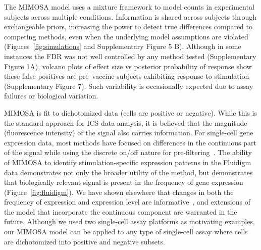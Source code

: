 \documentclass[12pt,oupdraft]{biostatistics}
\begin{document}
The MIMOSA model uses a mixture framework to model counts in experimental subjects across multiple conditions. Information is shared across subjects through exchangeable priors, increasing the power to detect true differences compared to competing methods, even when the underlying model assumptions are violated (Figures~\ref{fig:simulations} and Supplementary Figure 5 B). Although in some instances the FDR was not well controlled by any method tested (Supplementary Figure 1A), volcano plots of effect size vs posterior probability of response show these false positives are pre--vaccine subjects exhibiting response  to stimulation (Supplementary Figure 7). Such variability is occasionally expected due to assay failures or biological variation. 

MIMOSA is fit to dichotomized data (cells are positive or negative). While this is the standard approach for ICS data analysis, it is believed that the magnitude (fluorescence intensity) of the signal also carries information. For single-cell gene expression data, most methods have focused on differences in the continuous part of the signal while using the discrete on/off nature for pre-filtering~\citep{Flatz:2011jb}. 
The ability of MIMOSA to identify stimulation-specific expression patterns in the Fluidigm data demonstrates not only the broader utility of the method, but demonstrates that biologically relevant signal is present in the frequency of gene expression (Figure~\ref{fig:fluidigm}). 
We have shown elsewhere that changes in both the frequency of expression and expression level are informative~\citep{McDavid2012}, and extensions of the model that incorporate the continuous component are warranted in the future. 
Although we used two single-cell assay platforms as motivating examples, our MIMOSA model can be applied to any type of single-cell assay where cells are dichotomized into positive and negative subsets.

\end{document}
